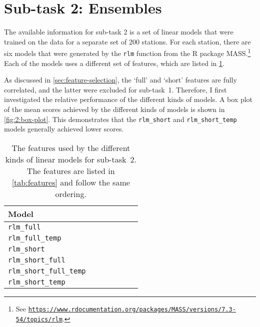 \documentclass[11pt]{extarticle}
\newcommand{\bikesavgfull}{\texttt{bikes\_avg\_full}}
\newcommand{\bikesavgshort}{\texttt{bikes\_avg\_short}}
\newcommand{\bikesh}{\texttt{bikes\_3h}}
\newcommand{\bikeshdiffavgfull}{\texttt{bikes\_3h\_diff\_avg\_full}}
\newcommand{\bikeshdiffavgshort}{\texttt{bikes\_3h\_diff\_avg\_short}}
\newcommand{\rlmfull}{\texttt{rlm\_full}}
\newcommand{\rlmfulltemp}{\texttt{rlm\_full\_temp}}
\newcommand{\rlmshort}{\texttt{rlm\_short}}
\newcommand{\rlmshortfull}{\texttt{rlm\_short\_full}}
\newcommand{\rlmshortfulltemp}{\texttt{rlm\_short\_full\_temp}}
\newcommand{\rlmshorttemp}{\texttt{rlm\_short\_temp}}
\begin{document}
\section{Sub-task 2: Ensembles}
\label{sec:results-subtask-2}

The available information for sub-task 2 is a set of linear models that were trained on
the data for a separate set of 200 stations.
For each station, there are six models that were generated by the \texttt{rlm} function
from the R package MASS.\footnote{See
  \href{https://www.rdocumentation.org/packages/MASS/versions/7.3-54/topics/rlm}{\texttt{https://www.rdocumentation.org/packages/MASS/versions/7.3-54/topics/rlm}}.
}
Each of the models uses a different set of features, which are listed in
\cref{tab:2:features}.

As discussed in \cref{sec:feature-selection}, the `full' and `short' features are fully
correlated, and the latter were excluded for sub-task~1.
Therefore, I first investigated the relative performance of the different kinds of
models.
A box plot of the mean scores achieved by the different kinds of models is shown in
\cref{fig:2:box-plot}.
This demonstrates that the \rlmshort{} and \rlmshorttemp{} models generally achieved
lower scores.

\begin{table}
  \centering
  \newcommand{\rlmtablerow}[7]{#1 & #7 & #2 & #3 & #4 & #5 & #6 \\}
  \begin{tabular}{lllllll}

    \rlmtablerow{Model}{\rot{\bikesh{}}}{\rot{\bikesavgfull{}}}{\rot{\bikesavgshort{}}}{\rot{\bikeshdiffavgfull{}}}{\rot{\bikeshdiffavgshort{}}}{\rot{\texttt{temperature}}}

    \midrule

    \rlmtablerow{\rlmfull{}}{\checkmark}{\checkmark}{}{\checkmark}{}{}

    \rlmtablerow{\rlmfulltemp{}}{\checkmark}{\checkmark}{}{\checkmark}{}{\checkmark}

    \rlmtablerow{\rlmshort{}}{\checkmark}{}{\checkmark}{}{\checkmark}{}

    \rlmtablerow{\rlmshortfull{}}{\checkmark}{\checkmark}{\checkmark}{\checkmark}{\checkmark}{}

    \rlmtablerow{\rlmshortfulltemp{}}{\checkmark}{\checkmark}{\checkmark}{\checkmark}{\checkmark}{\checkmark}

    \rlmtablerow{\rlmshorttemp{}}{\checkmark}{}{\checkmark}{}{\checkmark}{\checkmark}

    \bottomrule
  \end{tabular}
  \caption{The features used by the different kinds of linear
    models for sub-task~2.
    The features are listed in \cref{tab:features} and follow the same ordering.
  }
  \label{tab:2:features}
\end{table}
\end{document}

